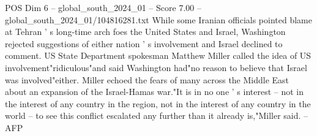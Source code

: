\begin{textsample}{POS Dim 6 – global\_south\_2024\_01 – Score 7.00 – global\_south\_2024\_01/104816281.txt}
While some Iranian officials pointed blame at Tehran ' s long-time arch foes the United States and Israel, Washington rejected suggestions of either nation ' s involvement and Israel declined to comment.
US State Department spokesman Matthew Miller called the idea of US involvement"ridiculous"and said Washington had"no reason to believe that Israel was involved"either.
Miller echoed the fears of many across the Middle East about an expansion of the Israel-Hamas war."It is in no one ' s interest -- not in the interest of any country in the region, not in the interest of any country in the world -- to see this conflict escalated any further than it already is,"Miller said. -- AFP

\end{textsample}
